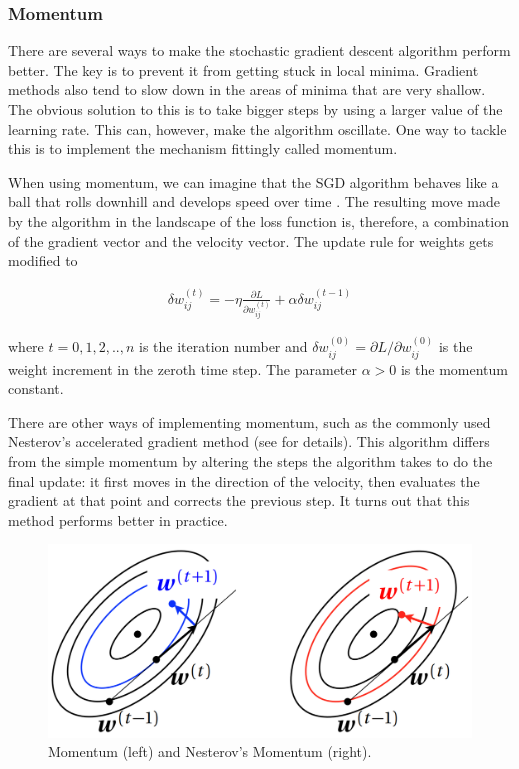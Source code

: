 \subsubsection{Momentum}

There are several ways to make the stochastic gradient descent algorithm perform better. The key is to prevent it from getting stuck in local minima. Gradient methods also tend to slow down in the areas of minima that are very shallow. The obvious solution to this is to take bigger steps by using a larger value of the learning rate. This can, however, make the algorithm oscillate. \cite{mehlig} One way to tackle this is to implement the mechanism fittingly called momentum. 

When using momentum, we can imagine that the SGD algorithm behaves like a ball that rolls downhill and develops speed over time \cite{stanford-L7}. The resulting move made by the algorithm in the landscape of the loss function is, therefore, a combination of the gradient vector and the velocity vector. The update rule for weights gets modified to \cite{mehlig}

\begin{gather}
\delta w_{ij}^{(t)} = - \eta \frac{\partial L}{\partial w_{ij}^{(t)}} + \alpha \delta w_{ij}^{(t-1)} 
\end{gather}

\noindent where $ t=0,1,2,..,n $ is the iteration number and $ \delta w_{ij}^{(0)} = \partial L / \partial w_{ij}^{(0)} $ is the weight increment in the zeroth time step. The parameter $ \alpha > 0$ is the momentum constant. \cite{mehlig}

There are other ways of implementing momentum, such as the commonly used Nesterov's accelerated gradient method (see \cite{mehlig} \cite{stanford-github} for details). This algorithm differs from the simple momentum by altering the steps the algorithm takes to do the final update: it first moves in the direction of the velocity, then evaluates the gradient at that point and corrects the previous step. It turns out that this method performs better in practice. \cite{stanford-L7}


\vspace{4mm}
\begin{figure}[htb]
	\begin{center}
		\includegraphics*[width=12cm, keepaspectratio]{obr/momentum.png}
	\end{center}
	\vspace{4mm}
	\caption{Momentum (left) and Nesterov's Momentum (right). \cite{mehlig}} 
	\label{momentum}
\end{figure}

